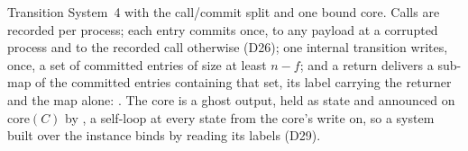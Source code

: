 \begin{definition}
  \label{def:aba-gather-spec}
  \leanok
  Transition System~4 with the call/commit split and one bound core.
  Calls are recorded per process; each entry commits once, to any payload at a corrupted process and to the recorded call otherwise (D26); one internal transition writes, once, a set of committed entries of size at least $n-f$; and a return delivers a sub-map of the committed entries containing that set, its label carrying the returner and the map alone: .
  The core is a ghost output, held as state and announced on $\mathrm{core}(C)$ by , a self-loop at every state from the core's write on, so a system built over the instance binds by reading its labels (D29).
\end{definition}
